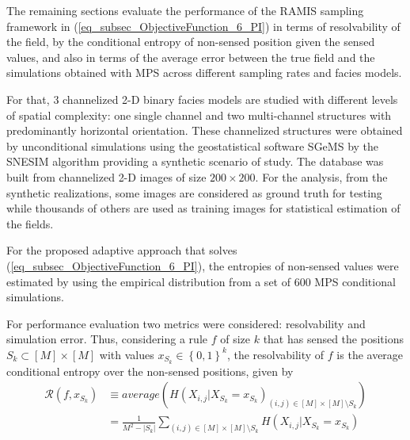 The remaining sections evaluate the performance of the RAMIS sampling framework in (\ref{eq_subsec_ObjectiveFunction_6_PI}) in terms of resolvability of the field, by the conditional entropy of non-sensed position given the sensed values, and also in terms of the average error between the true field and the simulations obtained with MPS across different sampling rates and facies models. 

For that, $3$ channelized {2-D} binary facies models are studied with different levels of spatial complexity: one single channel and two multi-channel structures with predominantly horizontal orientation. These channelized structures were obtained by unconditional simulations using the geostatistical software {SGeMS} by the {SNESIM} algorithm \citep{huang_2013_a,Remy_2009_a} providing a synthetic scenario of study. The database was built from channelized {2-D} images of size $200\times 200$. For the analysis, from the synthetic realizations, some images are considered as ground truth for testing while thousands of others are used as training images for statistical estimation of the fields.

For the proposed adaptive approach that solves (\ref{eq_subsec_ObjectiveFunction_6_PI}), the entropies of non-sensed values were estimated by using the empirical distribution from a set of $600$ {MPS} conditional simulations. 

For performance evaluation two metrics were considered: resolvability and simulation error. Thus, considering a rule $f$ of size $k$ that has sensed the positions $S_k\subset [M]\times [M] $ with values  $x_{S_k}\in \left\{ 0,1 \right\} ^k$, the resolvability of $f$ is the average conditional entropy over the non-sensed positions, given by
\begin{align}\label{eq_Metric_MeanEntropy_PI}
	\mathcal{R}(f, x_{S_{k}}) &\equiv    average(H(X_{i,j}| X_{S_{k}} = x_{S_{k}} )_{(i,j) \in [M]\times [M] \setminus S_{k}} )\nonumber\\
	&=\frac{1}{M^2-|S_{k}|}\sum_{(i,j) \in [M]\times [M] \setminus S_{k}} H(X_{i,j}| X_{S_{k}} = x_{S_{k}} )
\end{align}

